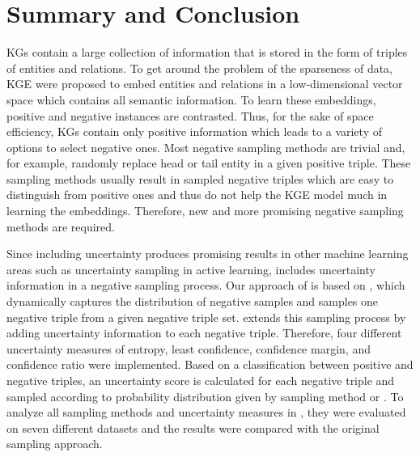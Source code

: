 \section{Summary and Conclusion}  
\label{sec:summary_and_conclusion}
\acp{KG} contain a large collection of information that is stored in the form of triples of entities and relations.
To get around the problem of the sparseness of data, \ac{KGE} were proposed to embed entities and relations in a low-dimensional vector space which contains all semantic information.
To learn these embeddings, positive and negative instances are contrasted.
Thus, for the sake of space efficiency, \acp{KG} contain only positive information which leads to a variety of options to select negative ones.
Most negative sampling methods are trivial and, for example, randomly replace head or tail entity in a given positive triple.
These sampling methods usually result in sampled negative triples which are easy to distinguish from positive ones and thus do not help the \ac{KGE} model much in learning the embeddings. 
Therefore, new and more promising negative sampling methods are required.

Since including uncertainty produces promising results in other machine learning areas such as uncertainty sampling in active learning, \usgan includes uncertainty information in a negative sampling process.
Our approach of \usgan is based on \kbgan, which dynamically captures the distribution of negative samples and samples one negative triple from a given negative triple set.
\usgan extends this sampling process by adding uncertainty information to each negative triple.
Therefore, four different uncertainty measures of entropy, least confidence, confidence margin, and confidence ratio were implemented.
Based on a classification between positive and negative triples, an uncertainty score is calculated for each negative triple and sampled according to probability distribution given by sampling method \ussoftmax or \usmax.
To analyze all sampling methods and uncertainty measures in \usgan, they were evaluated on seven different datasets and the results were compared with the original \kbgan sampling approach.

